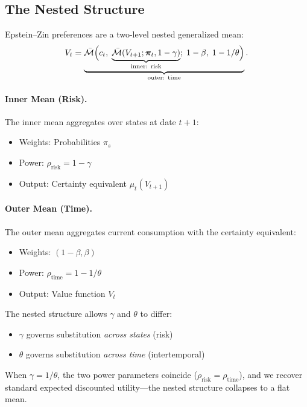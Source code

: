 \subsection{The Nested Structure}
\label{subsec:ez-nested-structure}

Epstein--Zin preferences are a two-level nested generalized mean:
\begin{equation}
V_t = \underbrace{\bar{\mathcal{M}}\Big( c_t, \; \underbrace{\bar{\mathcal{M}}(V_{t+1}; \bm{\pi}_t, 1-\gamma)}_{\text{inner: risk}}; \; 1-\beta, \; 1-1/\theta \Big)}_{\text{outer: time}}.
\label{eq:ez-nested}
\end{equation}

\paragraph{Inner Mean (Risk).}
The inner mean aggregates over states at date $t+1$:
\begin{itemize}[leftmargin=2em]
    \item Weights: Probabilities $\pi_s$
    \item Power: $\rho_{\text{risk}} = 1 - \gamma$
    \item Output: Certainty equivalent $\mu_t(V_{t+1})$
\end{itemize}

\paragraph{Outer Mean (Time).}
The outer mean aggregates current consumption with the certainty equivalent:
\begin{itemize}[leftmargin=2em]
    \item Weights: $(1-\beta, \beta)$
    \item Power: $\rho_{\text{time}} = 1 - 1/\theta$
    \item Output: Value function $V_t$
\end{itemize}

\begin{calloutimportant}
The nested structure allows $\gamma$ and $\theta$ to differ:
\begin{itemize}[leftmargin=1.5em]
    \item $\gamma$ governs substitution \emph{across states} (risk)
    \item $\theta$ governs substitution \emph{across time} (intertemporal)
\end{itemize}
When $\gamma = 1/\theta$, the two power parameters coincide ($\rho_{\text{risk}} = \rho_{\text{time}}$), and we recover standard expected discounted utility---the nested structure collapses to a flat mean.
\end{calloutimportant}

